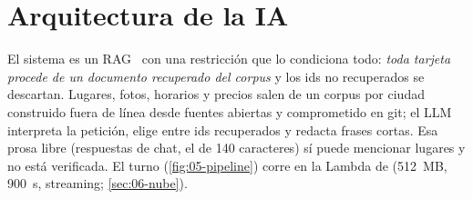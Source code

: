\section{Arquitectura de la IA}\label{sec:05-arquitectura-ia}

El sistema es un RAG~\cite{ai:lewis2020rag} con una restricción que lo condiciona todo:
\emph{toda tarjeta procede de un documento recuperado del corpus} y los ids no recuperados se
descartan. Lugares, fotos, horarios y precios salen de un corpus por ciudad construido fuera de
línea desde fuentes abiertas y comprometido en git; el LLM interpreta la petición, elige entre ids
recuperados y redacta frases cortas. Esa prosa libre (respuestas de chat, el  de 140
caracteres) sí puede mencionar lugares y no está verificada. El turno
(\cref{fig:05-pipeline}) corre en la Lambda de  (512~MB, 900~s, streaming;
\cref{sec:06-nube}).


